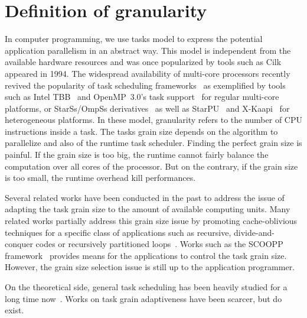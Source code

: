 \section{Definition of granularity}
In computer programming, we use tasks model to express the potential application parallelism in an abstract way.
%
This model is independent from the available hardware resources and was once popularized by tools such as Cilk~\cite{cilk} appeared in 1994.
%
The widespread availability of multi-core processors recently revived the popularity of task scheduling frameworks~\cite{taskscomparison} as exemplified by tools such as Intel TBB~\cite{Intel::TBB} and OpenMP~3.0's task support~\cite{openmptasks} for regular multi-core platforms, or StarSs/OmpSs derivatives~\cite{ompss} as well as StarPU~\cite{starpu} and X-Kaapi~\cite{xkaapi} for heterogeneous platforms.
%
In these model, granularity refers to the number of CPU instructions inside a task.
%
The tasks grain size depends on the algorithm to parallelize and also of the runtime task scheduler.
%
Finding the perfect grain size is painful.
%
If the grain size is too big, the runtime cannot fairly balance the computation over all cores of the processor.
%
But on the contrary, if the grain size is too small, the runtime overhead kill performances.


Several related works have been conducted in the past to address the issue of adapting the task grain size to the amount of available computing units.
%
Many related works partially address this grain size issue by promoting cache-oblivious techniques for a specific class of
applications such as recursive, divide-and-conquer codes or recursively partitioned loops~\cite{unifieddataflow,Intel::TBB,cilk,xkaapi,taskscomparison}.
%
Works such as the SCOOPP framework~\cite{scoopp} provides means for the applications to control the task grain size.
%
However, the grain size selection issue is still up to the application programmer.


On the theoretical side, general task scheduling has been heavily studied for a long time now~\cite{Khan94acomparison,heft}.
%
Works on task grain adaptiveness have been scarcer, but do exist.